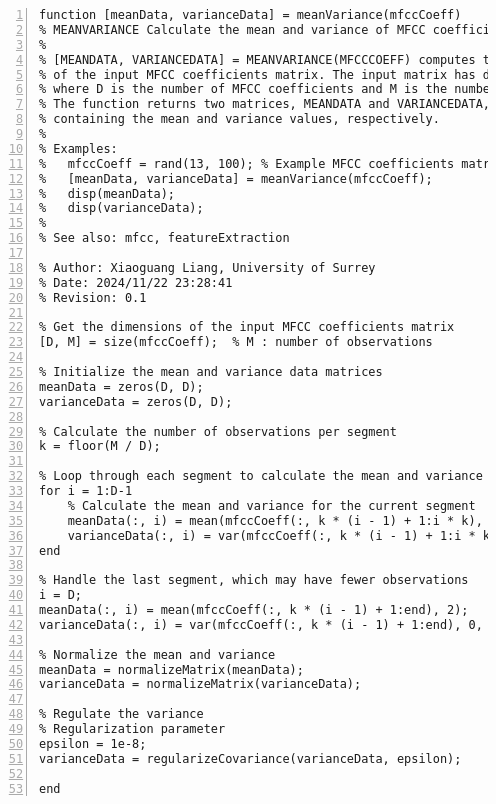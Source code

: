 \documentclass{article}
\begin{document}
\begin{lstlisting}[frame=single, numbers=left, style=Matlab-editor, caption={meanVariance.m}, label={lst:meanVariance}]
  function [meanData, varianceData] = meanVariance(mfccCoeff)
% MEANVARIANCE Calculate the mean and variance of MFCC coefficients.
%
% [MEANDATA, VARIANCEDATA] = MEANVARIANCE(MFCCCOEFF) computes the mean and variance
% of the input MFCC coefficients matrix. The input matrix has dimensions D x M,
% where D is the number of MFCC coefficients and M is the number of observations.
% The function returns two matrices, MEANDATA and VARIANCEDATA, each of size D x D,
% containing the mean and variance values, respectively.
%
% Examples:
%   mfccCoeff = rand(13, 100); % Example MFCC coefficients matrix (13 coefficients, 100 observations)
%   [meanData, varianceData] = meanVariance(mfccCoeff);
%   disp(meanData);
%   disp(varianceData);
%
% See also: mfcc, featureExtraction

% Author: Xiaoguang Liang, University of Surrey
% Date: 2024/11/22 23:28:41
% Revision: 0.1

% Get the dimensions of the input MFCC coefficients matrix
[D, M] = size(mfccCoeff);  % M : number of observations

% Initialize the mean and variance data matrices
meanData = zeros(D, D);
varianceData = zeros(D, D);

% Calculate the number of observations per segment
k = floor(M / D);

% Loop through each segment to calculate the mean and variance
for i = 1:D-1
    % Calculate the mean and variance for the current segment
    meanData(:, i) = mean(mfccCoeff(:, k * (i - 1) + 1:i * k), 2);
    varianceData(:, i) = var(mfccCoeff(:, k * (i - 1) + 1:i * k), 0, 2);
end

% Handle the last segment, which may have fewer observations
i = D;
meanData(:, i) = mean(mfccCoeff(:, k * (i - 1) + 1:end), 2);
varianceData(:, i) = var(mfccCoeff(:, k * (i - 1) + 1:end), 0, 2);

% Normalize the mean and variance
meanData = normalizeMatrix(meanData);
varianceData = normalizeMatrix(varianceData);

% Regulate the variance
% Regularization parameter
epsilon = 1e-8;
varianceData = regularizeCovariance(varianceData, epsilon);

end
\end{lstlisting}
\end{document}
